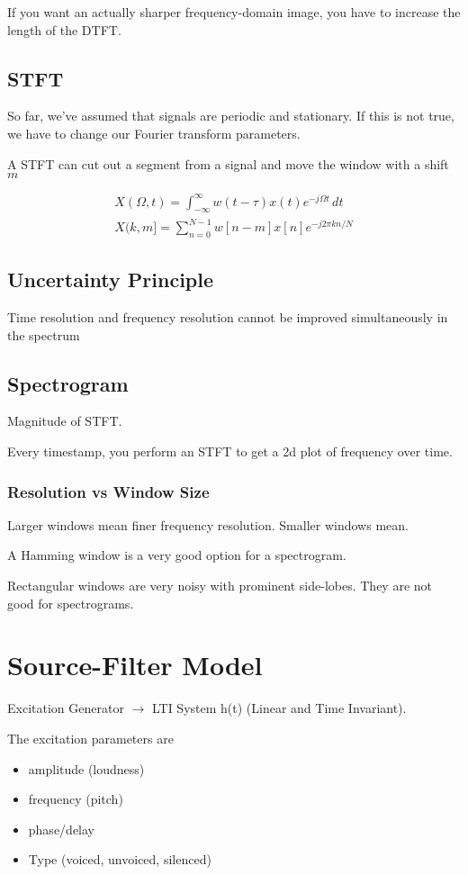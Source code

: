 \documentclass[fleqn]{report}
\newcommand{\equations} [1] {
\begin{gather*}
#1
\end{gather*}
}
\begin{document}
If you want an actually sharper frequency-domain image, you have to 
increase the length of the DTFT.

\section{STFT}
So far, we've assumed that signals are periodic and stationary. If this is 
not true, we have to change our Fourier transform parameters. 

A STFT can cut out a segment from a signal and move the window 
with a shift $m$ 

\equations{
    X(\Omega, t)
    =
    \int^{\infty}_{-\infty}
    w(t - \tau) x(t) e^{-j \Omega t} \, dt 
    \\
    X(k, m]
    =
    \sum_{n=0}^{N-1}
    w[n - m] x[n] e^{-j 2 \pi k n / N}
}

\section{Uncertainty Principle}
Time resolution and frequency resolution
cannot be improved simultaneously
in the spectrum

\section{Spectrogram}
Magnitude of STFT. 

Every timestamp, you perform an STFT to get a 2d plot 
of frequency over time. 

\subsection{Resolution vs Window Size}
Larger windows mean finer frequency resolution. Smaller windows 
mean. 

A Hamming window is a very good option for a spectrogram. 

Rectangular windows are very noisy with prominent side-lobes. They are not 
good for spectrograms. 

\chapter{Source-Filter Model}
Excitation Generator $\rightarrow$ LTI System h(t) (Linear and Time 
Invariant).

The excitation parameters are 

\begin{itemize}
    \item 
    amplitude (loudness)
    \item 
    frequency (pitch)
    \item 
    phase/delay 
    \item 
    Type (voiced, unvoiced, silenced)
\end{itemize}
\end{document}
